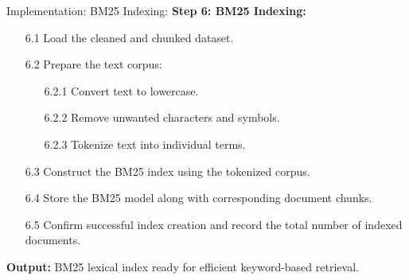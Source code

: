 \begin{frame}{Implementation: BM25 Indexing:}
    \textbf{Step 6: BM25 Indexing:}
    \begin{itemize}
    
        \item[6.1] Load the cleaned and chunked dataset.
    
        \item[6.2] Prepare the text corpus:
              \begin{itemize}
                  \item[6.2.1] Convert text to lowercase.
                  \item[6.2.2] Remove unwanted characters and symbols.
                  \item[6.2.3] Tokenize text into individual terms.
              \end{itemize}
    
        \item[6.3] Construct the BM25 index using the tokenized corpus.
    
        \item[6.4] Store the BM25 model along with corresponding document chunks.
    
        \item[6.5] Confirm successful index creation
                  and record the total number of indexed documents.
    
    \end{itemize}
    
    \textbf{Output:} BM25 lexical index ready for efficient keyword-based retrieval.

\end{frame}

